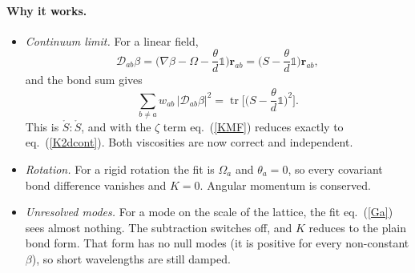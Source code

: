 \documentclass[11pt,aps,preprint,nofootinbib,superscriptaddress,tightenlines]{revtex4-2}
\def\st{\begin{equation}}
\def\stp{\end{equation}}
\def\Eq#1{eq.~(\ref{#1})}
\providecommand{\tr}{\operatorname{tr}}
\newcommand{\one}{\mathds{1}}
\let\oldparagraph\paragraph
\renewcommand{\paragraph}{\par\bigskip\oldparagraph}
\begin{document}
\paragraph{Why it works.}
\begin{itemize}
\item \emph{Continuum limit.}  For a linear field,
  \st
  \mathcal D_{ab}\beta=\Big(\nabla\beta-\Omega-\frac{\theta}{d}\one\Big)\bm r_{ab}=\Big(S-\frac{\theta}{d}\one\Big)\bm r_{ab},
  \stp
  and the bond sum gives
  \st
  \sum_{b\neq a}w_{ab}\,|\mathcal D_{ab}\beta|^2=\tr\Big[\Big(S-\frac{\theta}{d}\one\Big)^2\Big].
  \stp
  This is $\mathring S{:}\mathring S$, and with the $\zeta$ term \Eq{KMF} reduces
  exactly to \Eq{K2dcont}.  Both viscosities are now correct and
  independent.
\item \emph{Rotation.}  For a rigid rotation the fit is $\Omega_a$ and
  $\theta_a=0$, so every covariant bond difference vanishes and $K=0$.  Angular
  momentum is conserved.
\item \emph{Unresolved modes.}  For a mode on the scale of the lattice, the fit
  \Eq{Ga} sees almost nothing.  The subtraction switches off, and
  $K$ reduces to the plain bond form.  That form has no null modes
  (it is positive for every non-constant $\beta$), so short wavelengths are still damped.
\end{itemize}
\end{document}
